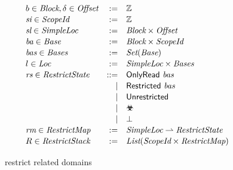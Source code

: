 \begin{figure}[htb]
\[\def\arraystretch{1.1}
\begin{array}{lrll}
    b \in \Block, \delta \in \Offset            &   :=          & \Intdomain                                                      & \\
    \Scopeidvar \in \Scopeid                    &   :=          & \Intdomain                                                      & \\
    \Simplelocvar \in \Simpleloc                &   :=          & \Block \times \Offset                                           & \\
    \Basevar \in \Base                          &   :=          & \Block \times \Scopeid                                          & \\
    \Basesvar \in \Bases                        &   :=          & \Set{\Base}                                                     & \\
    l \in \Loc                                  &   :=          & \Simpleloc \times \Bases                                        & \\
    \Restrictstatevar \in \Restrictstate        &   \bnfdef     & \onlyread{\Basesvar}                                               & \\
                                                &   |           & \restricted{\Basesvar}                                             & \\
                                                &   |           & \unrestricted                                                   & \\
                                                &   |           & \rsub                                                           & \\
                                                &   |           & \bot                                                            & \\
    \Restrictmapvar \in \Restrictmap            &   :=          & \Simpleloc \rightharpoonup \Restrictstate                           & \\
    R \in \Restrictstack                        &   :=          & \List{\Scopeid \times \Restrictmap}                             &
\end{array}
\]
\caption{\cink{} restrict related domains}
\label{fig:cink-domains}
\end{figure}

